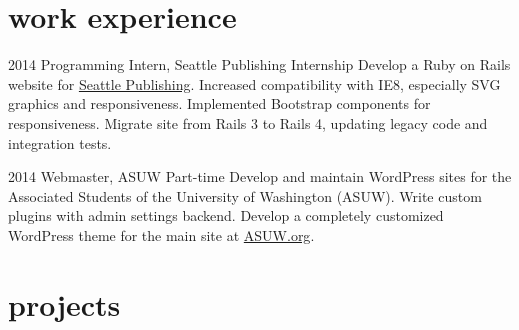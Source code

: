 \documentclass[]{friggeri-cv}
\begin{document}
\section{work experience}

\begin{entrylist}
  \entry 
    {2014}
    {Programming Intern, Seattle Publishing}
    {Internship}
    {Develop a Ruby on Rails website for \href{http://seattlepublishing.com}{Seattle Publishing}. Increased compatibility with IE8, especially SVG graphics and responsiveness. Implemented Bootstrap components for responsiveness. Migrate site from Rails 3 to Rails 4, updating legacy code and integration tests.}
  
  \entry
    {2014}
    {Webmaster, ASUW}
    {Part-time}
    {Develop and maintain WordPress sites for the Associated Students of the University of Washington (ASUW). Write custom plugins with admin settings backend. Develop a completely customized WordPress theme for the main site at \href{http://asuw.org}{ASUW.org}.}
\end{entrylist}

\section{projects}
\end{document}

